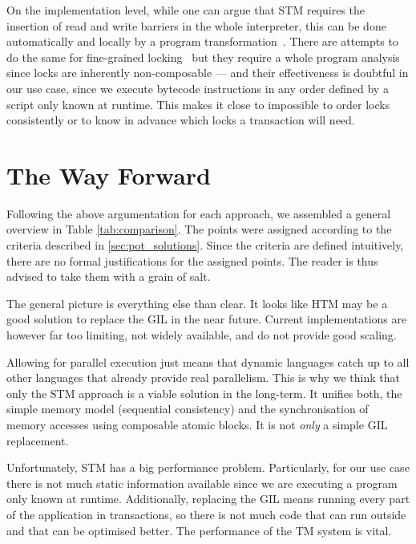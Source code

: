 \documentclass{sigplanconf}
\begin{document}
On the implementation level,
while one can argue that STM requires the insertion of read and write
barriers in the whole interpreter, this can be done automatically and
locally by a program transformation~\cite{felber07}. There are attempts
to do the same for fine-grained locking~\cite{bill06} but they require
a whole program analysis since locks are inherently non-composable
--- and their effectiveness is doubtful in our use case,
since we execute bytecode instructions in any order defined by a
script only known at runtime. This makes it close to impossible to
order locks consistently or to know in advance which locks a
transaction will need.




\section{The Way Forward}


Following the above argumentation for each approach, we assembled a
general overview in Table \ref{tab:comparison}. The points were assigned
according to the criteria described in \ref{sec:pot_solutions}. Since
the criteria are defined intuitively, there are no formal justifications
for the assigned points. The reader is thus advised to take them with a
grain of salt.

The general picture is everything else than clear. It looks like HTM
may be a good solution to replace the GIL in the near future. Current
implementations are however far too limiting, not widely available,
and do not provide good scaling.

Allowing for parallel execution just means that dynamic languages
catch up to all other languages that already provide real
parallelism. This is why we think that only the STM approach is a
viable solution in the long-term. It unifies both, the simple memory
model (sequential consistency) and the synchronisation of memory accesses
using composable atomic blocks. It is not \emph{only} a simple GIL
replacement.

Unfortunately, STM has a big performance problem. Particularly, for
our use case there is not much static information available since we
are executing a program only known at runtime. Additionally, replacing
the GIL means running every part of the application in transactions,
so there is not much code that can run outside and that can be
optimised better. The performance of the TM system is vital.
\end{document}
